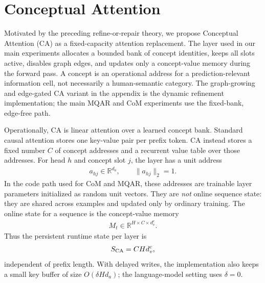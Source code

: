 \section{Conceptual Attention}
\label{sec:main-ca}

Motivated by the preceding refine-or-repair theory, we propose Conceptual Attention (CA) as a fixed-capacity attention replacement. The layer used in our main experiments allocates a bounded bank of concept identities, keeps all slots active, disables graph edges, and updates only a concept-value memory during the forward pass. A concept is an operational address for a prediction-relevant information cell, not necessarily a human-semantic category. The graph-growing and edge-gated CA variant in the appendix is the dynamic refinement implementation; the main MQAR and CoM experiments use the fixed-bank, edge-free path.

Operationally, CA is linear attention over a learned concept bank. Standard causal attention stores one key-value pair per prefix token. CA instead stores a fixed number $C$ of concept addresses and a recurrent value table over those addresses. For head $h$ and concept slot $j$, the layer has a unit address
\begin{align*}
a_{hj}\in\mathbb{R}^{d_a},\qquad \|a_{hj}\|_2=1 .
\end{align*}
In the code path used for CoM and MQAR, these addresses are trainable layer parameters initialized as random unit vectors. They are \emph{not} online sequence state: they are shared across examples and updated only by ordinary training. The online state for a sequence is the concept-value memory
\begin{align*}
M_t\in\mathbb{R}^{H\times C\times d_v^c}.
\end{align*}
Thus the persistent runtime state per layer is
\begin{align*}
S_{\rm CA}=C H d_v^c ,
\end{align*}
independent of prefix length. With delayed writes, the implementation also keeps a small key buffer of size $O(\delta H d_a)$; the language-model setting uses $\delta=0$.

